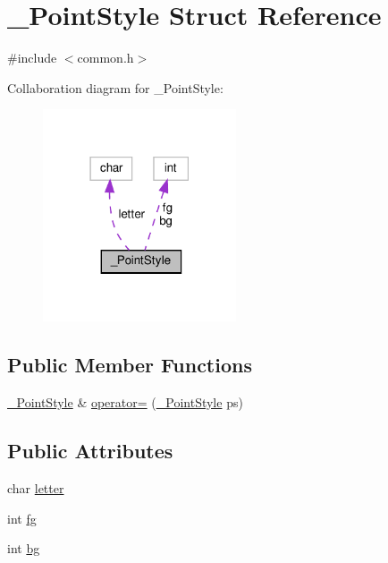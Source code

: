 \hypertarget{struct___point_style}{}\section{\+\_\+\+Point\+Style Struct Reference}
\label{struct___point_style}


{\ttfamily \#include $<$common.\+h$>$}



Collaboration diagram for \+\_\+\+Point\+Style\+:
\nopagebreak
\begin{figure}[H]
\begin{center}
\leavevmode
\includegraphics[width=162pt]{struct___point_style__coll__graph}
\end{center}
\end{figure}
\subsection*{Public Member Functions}
\begin{DoxyCompactItemize}
\item 
\mbox{\hyperlink{struct___point_style}{\+\_\+\+Point\+Style}} \& \mbox{\hyperlink{struct___point_style_a1928e8b7e2cf5588abbccf6774bd1714}{operator=}} (\mbox{\hyperlink{struct___point_style}{\+\_\+\+Point\+Style}} ps)
\end{DoxyCompactItemize}
\subsection*{Public Attributes}
\begin{DoxyCompactItemize}
\item 
char \mbox{\hyperlink{struct___point_style_aa4cf23b21f61b08b05ff90b37fb26bc8}{letter}}
\item 
int \mbox{\hyperlink{struct___point_style_aad357bccd6e6759fc8575d3354d2bc7b}{fg}}
\item 
int \mbox{\hyperlink{struct___point_style_a0f1cb3b870284fd00ca8bdc2cbb782ca}{bg}}
\end{DoxyCompactItemize}


